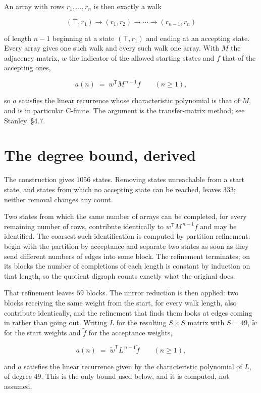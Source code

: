 \documentclass[11pt]{article}
\theoremstyle{definition}
\begin{document}
An array with rows $r_1,\dots,r_n$ is then exactly a walk

\[(\top,r_1) \to (r_1,r_2) \to \cdots \to (r_{n-1},r_n)\]

of length $n-1$ beginning at a state $(\top,r_1)$ and ending at an accepting state. Every array gives one such walk and every such walk one array. With $M$ the adjacency matrix, $w$ the indicator of the allowed starting states and $f$ that of the accepting ones,

\[a(n) \;=\; w^{\mathsf T} M^{\,n-1} f \qquad (n \ge 1),\]

so $a$ satisfies the linear recurrence whose characteristic polynomial is that of $M$, and is in particular C-finite. The argument is the transfer-matrix method; see Stanley~\S4.7.

\section{The degree bound, derived}

The construction gives $1056$ states. Removing states unreachable from a start state, and states from which no accepting state can be reached, leaves $333$; neither removal changes any count.

Two states from which the same number of arrays can be completed, for every remaining number of rows, contribute identically to $w^{\mathsf T}M^{\,n-1}f$ and may be identified. The coarsest such identification is computed by partition refinement: begin with the partition by acceptance and separate two states as soon as they send different numbers of edges into some block. The refinement terminates; on its blocks the number of completions of each length is constant by induction on that length, so the quotient digraph counts exactly what the original does.

That refinement leaves $59$ blocks. The mirror reduction is then applied: two blocks receiving the same weight from the start, for every walk length, also contribute identically, and the refinement that finds them looks at edges coming in rather than going out. Writing $L$ for the resulting $S \times S$ matrix with $S = 49$, $\tilde w$ for the start weights and $\tilde f$ for the acceptance weights,

\[a(n) \;=\; \tilde w^{\mathsf T} L^{\,n-1} \tilde f \qquad (n \ge 1),\]

and $a$ satisfies the linear recurrence given by the characteristic polynomial of $L$, of degree $49$. This is the only bound used below, and it is computed, not assumed.
\end{document}
